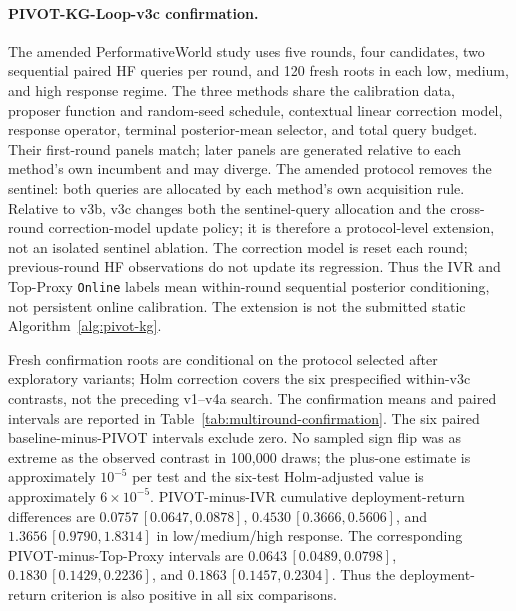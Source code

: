 \documentclass{article}
\begin{document}
\paragraph{PIVOT-KG-Loop-v3c confirmation.}
The amended PerformativeWorld study uses five rounds, four candidates, two
sequential paired HF queries per round, and 120 fresh roots in each low,
medium, and high response regime. The three methods share the calibration data,
proposer function and random-seed schedule, contextual linear correction model,
response operator, terminal posterior-mean selector, and total query budget.
Their first-round panels match; later panels are generated relative to each
method's own incumbent and may diverge. The amended protocol removes the
sentinel: both queries are allocated by each method's own acquisition rule.
Relative to v3b, v3c changes both the sentinel-query allocation and the
cross-round correction-model update policy; it is therefore a protocol-level
extension, not an isolated sentinel ablation. The correction model is reset
each round; previous-round HF observations do not update its regression. Thus
the IVR and Top-Proxy \texttt{Online} labels mean
within-round sequential posterior conditioning, not persistent online
calibration. The extension is not the submitted static
Algorithm~\ref{alg:pivot-kg}.

Fresh confirmation roots are conditional on the protocol selected after
exploratory variants; Holm correction covers the six prespecified within-v3c
contrasts, not the preceding v1--v4a search. The confirmation means and paired
intervals are reported in Table~\ref{tab:multiround-confirmation}. The six paired baseline-minus-PIVOT intervals exclude zero. No
sampled sign flip was as extreme as the observed contrast in 100,000 draws;
the plus-one estimate is approximately $10^{-5}$ per test and the six-test
Holm-adjusted value is approximately $6\times10^{-5}$. PIVOT-minus-IVR
cumulative deployment-return differences are
$0.0757\,[0.0647,0.0878]$, $0.4530\,[0.3666,0.5606]$, and
$1.3656\,[0.9790,1.8314]$ in low/medium/high response. The corresponding
PIVOT-minus-Top-Proxy intervals are
$0.0643\,[0.0489,0.0798]$, $0.1830\,[0.1429,0.2236]$, and
$0.1863\,[0.1457,0.2304]$. Thus the deployment-return criterion is also
positive in all six comparisons.
\end{document}
